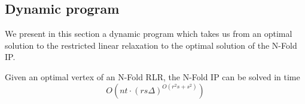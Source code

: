 \newpage
\subsection{Dynamic program}        

We present in this section a dynamic program which takes us from an optimal solution to the restricted linear relaxation to the optimal solution of the N-Fold IP.

\begin{proposition}
    Given an optimal vertex of an N-Fold RLR, the N-Fold IP can be solved in time
    \begin{equation*}
        O(nt \cdot (rs\Delta)^{O(r^2s+s^2)})
    \end{equation*}
\end{proposition}
